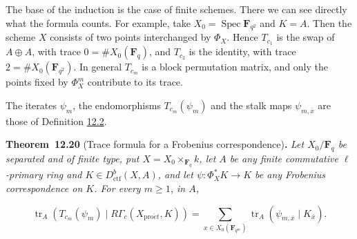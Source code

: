 \documentclass[11pt]{article}
\newenvironment{bpstatement}[2]{\par\addvspace{0.6\baselineskip}\noindent\textbf{#1}#2\textbf{.}\enspace\ignorespaces}
  {\par\addvspace{0.4\baselineskip}}
\newenvironment{bpstatementit}[2]{\begin{bpstatement}{#1}{#2}\itshape\ignorespaces}{\end{bpstatement}}
\begin{document}
The base of the induction is the case of finite schemes. There we can see directly what the formula counts. For example, take \(X_0=\operatorname{Spec}\mathbf F_{q^2}\) and \(K=A\). Then the scheme \(X\) consists of two points interchanged by \(\Phi_X\). Hence \(T_{c_1}\) is the swap of \(A\oplus A\), with trace \(0=\#X_0(\mathbf F_q)\), and \(T_{c_2}\) is the identity, with trace \(2=\#X_0(\mathbf F_{q^2})\). In general \(T_{c_m}\) is a block permutation matrix, and only the points fixed by \(\Phi_X^m\) contribute to its trace.

The iterates \(\psi_m\), the endomorphisms \(T_{c_m}(\psi_m)\) and the stalk maps \(\psi_{m,\bar x}\) are those of Definition \hyperref[bp7]{12.2}.

\label{bp62}%
\begin{bpstatementit}{Theorem~12.20}{ (Trace formula for a Frobenius correspondence)}
Let \(X_0/\mathbf F_q\) be separated and of finite type, put \(X=X_0\times_{\mathbf F_q}k\), let \(A\) be any finite commutative \(\ell\)-primary ring and \(K\in D^b_{\mathrm{ctf}}(X,A)\), and let \(\psi:\Phi_X^*K\to K\) be any Frobenius correspondence on \(K\). For every \(m\geq1\), in \(A\),

\[
\operatorname{tr}_A(T_{c_m}(\psi_m)\mid R\Gamma_c(X_{\mathrm{pro}\acute{e}t},K))
=\sum_{x\in X_0(\mathbf F_{q^m})}
\operatorname{tr}_A(\psi_{m,\bar x}\mid K_{\bar x}).
\]
\end{bpstatementit}
\end{document}
